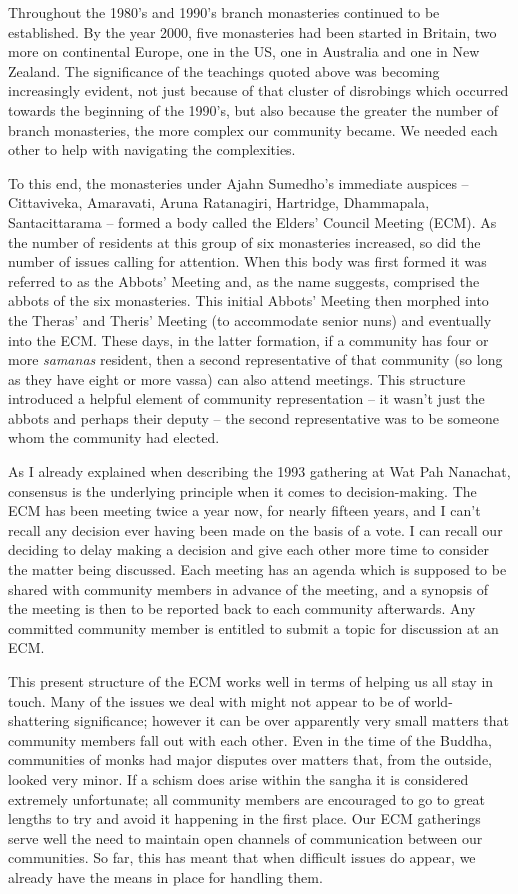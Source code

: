 Throughout the 1980's and 1990's branch monasteries continued to be
established. By the year 2000, five monasteries\cite{monasteries}
had been started in Britain, two more on
continental Europe, one in the US, one in Australia and one in New
Zealand. The significance of the teachings quoted above was becoming
increasingly evident, not just because of that cluster of disrobings
which occurred towards the beginning of the 1990's, but also because the
greater the number of branch monasteries, the more complex our community
became. We needed each other to help with navigating the complexities.

To this end, the monasteries under Ajahn Sumedho's immediate auspices --
Cittaviveka, Amaravati, Aruna Ratanagiri, Hartridge, Dhammapala,
Santacittarama -- formed a body called the Elders' Council Meeting
(ECM). As the number of residents at this group of six monasteries
increased, so did the number of issues calling for attention. When this
body was first formed it was referred to as the Abbots' Meeting and, as
the name suggests, comprised the abbots of the six monasteries. This
initial Abbots' Meeting then morphed into the Theras' and Theris'
Meeting (to accommodate senior nuns) and eventually into the ECM. These
days, in the latter formation, if a community has four or more
\emph{samanas} resident, then a second representative of that community
(so long as they have eight or more vassa) can also attend meetings.
This structure introduced a helpful element of community representation
-- it wasn't just the abbots and perhaps their deputy -- the second
representative was to be someone whom the community had elected.

As I already explained when describing the 1993 gathering at Wat Pah
Nanachat, consensus is the underlying principle when it comes to
decision-making. The ECM has been meeting twice a year now, for nearly
fifteen years, and I can't recall any decision ever having been made on
the basis of a vote. I can recall our deciding to delay making a
decision and give each other more time to consider the matter being
discussed. Each meeting has an agenda which is supposed to be shared
with community members in advance of the meeting, and a synopsis of the
meeting is then to be reported back to each community afterwards. Any
committed community member is entitled to submit a topic for discussion
at an ECM.

This present structure of the ECM works well in terms of helping us all
stay in touch. Many of the issues we deal with might not appear to be of
world-shattering significance; however it can be over apparently very
small matters that community members fall out with each other. Even in
the time of the Buddha, communities of monks had major disputes over
matters that, from the outside, looked very minor. If a schism does
arise within the sangha it is considered extremely unfortunate; all
community members are encouraged to go to great lengths to try and avoid
it happening in the first place. Our ECM gatherings serve well the need
to maintain open channels of communication between our communities. So
far, this has meant that when difficult issues do appear, we already
have the means in place for handling them.


